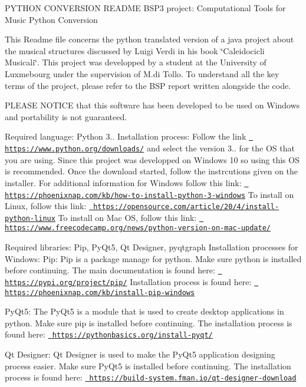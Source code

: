 PYTHON CONVERSION README BSP3 project\+: Computational Tools for Music Python Conversion

This Readme file concerns the python translated version of a java project about the musical structures discussed by Luigi Verdi in his book \char`\"{}\+Caleidocicli Musicali\char`\"{}. This project was developped by a student at the University of Luxmebourg under the supervision of M.\+di Tollo. To understand all the key terms of the project, please refer to the BSP report written alongside the code.

PLEASE NOTICE that this software has been developed to be used on Windows and portability is not guaranteed.

Required language\+: Python 3.. Installation process\+: Follow the link \href{https://www.python.org/downloads/}{\texttt{ https\+://www.\+python.\+org/downloads/}} and select the version 3.. for the OS that you are using. Since this project was developped on Windows 10 so using this OS is recommended. Once the download started, follow the instrcutions given on the installer. For additional information for Windows follow this link\+: \href{https://phoenixnap.com/kb/how-to-install-python-3-windows}{\texttt{ https\+://phoenixnap.\+com/kb/how-\/to-\/install-\/python-\/3-\/windows}} To install on Linux, follow this link\+: \href{https://opensource.com/article/20/4/install-python-linux}{\texttt{ https\+://opensource.\+com/article/20/4/install-\/python-\/linux}} To install on Mac OS, follow this link\+: \href{https://www.freecodecamp.org/news/python-version-on-mac-update/}{\texttt{ https\+://www.\+freecodecamp.\+org/news/python-\/version-\/on-\/mac-\/update/}}

Required libraries\+: Pip, Py\+Qt5, Qt Designer, pyqtgraph Installation processes for Windows\+: Pip\+: Pip is a package manage for python. Make sure python is installed before continuing. The main documentation is found here\+: \href{https://pypi.org/project/pip/}{\texttt{ https\+://pypi.\+org/project/pip/}} Installation process is found here\+: \href{https://phoenixnap.com/kb/install-pip-windows}{\texttt{ https\+://phoenixnap.\+com/kb/install-\/pip-\/windows}}

Py\+Qt5\+: The Py\+Qt5 is a module that is used to create desktop applications in python. Make sure pip is installed before continuing. The installation process is found here\+: \href{https://pythonbasics.org/install-pyqt/}{\texttt{ https\+://pythonbasics.\+org/install-\/pyqt/}}

Qt Designer\+: Qt Designer is used to make the Py\+Qt5 application designing process easier. Make sure Py\+Qt5 is installed before continuing. The installation process is found here\+: \href{https://build-system.fman.io/qt-designer-download}{\texttt{ https\+://build-\/system.\+fman.\+io/qt-\/designer-\/download}}

